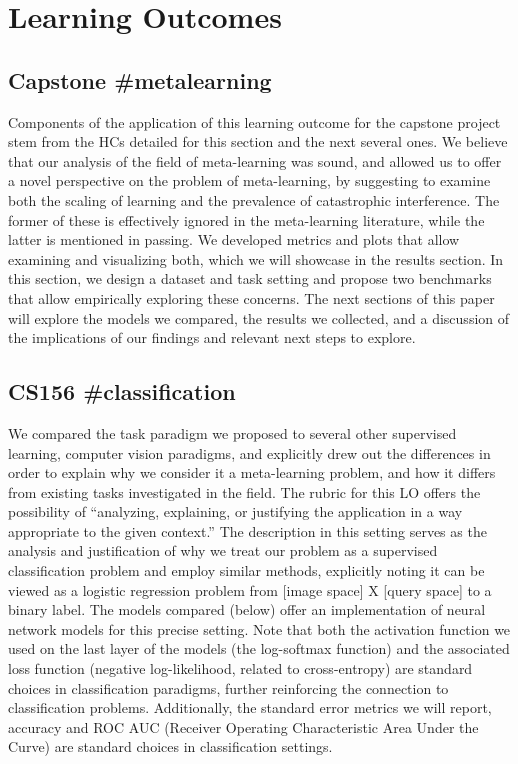 \section{Learning Outcomes}

\subsection{Capstone \#metalearning}
Components of the application of this learning outcome for the capstone project stem from the HCs detailed for this section and the next several ones. We believe that our analysis of the field of meta-learning was sound, and allowed us to offer a novel perspective on the problem of meta-learning, by suggesting to examine both the scaling of learning and the prevalence of catastrophic interference. The former of these is effectively ignored in the meta-learning literature, while the latter is mentioned in passing. We developed metrics and plots that allow examining and visualizing both, which we will showcase in the results section. In this section, we design a dataset and task setting and propose two benchmarks that allow empirically exploring these concerns. The next sections of this paper will explore the models we compared, the results we collected, and a discussion of the implications of our findings and relevant next steps to explore.

\subsection{CS156 \#classification}
We compared the task paradigm we proposed to several other supervised learning, computer vision paradigms, and explicitly drew out the differences in order to explain why we consider it a meta-learning problem, and how it differs from existing tasks investigated in the field. The rubric for this LO offers the possibility of “analyzing, explaining, or justifying the application in a way appropriate to the given context.” The description in this setting serves as the analysis and justification of why we treat our problem as a supervised classification problem and employ similar methods, explicitly noting it can be viewed as a logistic regression problem from [image space] X [query space] to a binary label. The models compared (below) offer an implementation of neural network models for this precise setting. Note that both the activation function we used on the last layer of the models (the log-softmax function) and the associated loss function (negative log-likelihood, related to cross-entropy) are standard choices in classification paradigms, further reinforcing the connection to classification problems. Additionally, the standard error metrics we will report, accuracy and ROC AUC (Receiver Operating Characteristic Area Under the Curve) are standard choices in classification settings.

